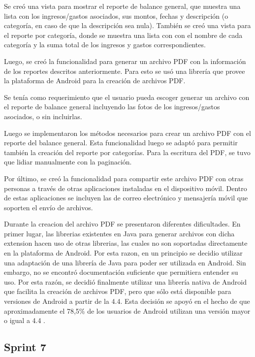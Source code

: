 Se creó una vista para mostrar el reporte de balance general, que muestra una lista con los ingresos/gastos asociados, sus montos, fechas y descripción (o categoría, en caso de que la descripción sea nula). También se creó una vista para el reporte por categoría, donde se muestra una lista con con el nombre de cada categoría y la suma total de los ingresos y gastos correspondientes.

Luego, se creó la funcionalidad para generar un archivo PDF con la información de los reportes descritos anteriormente. Para esto se usó una librería que provee la plataforma de Android para la creación de archivos PDF.  

Se tenía como requerimiento que el usuario pueda escoger generar un archivo con el reporte de balance general incluyendo las fotos de los ingresos/gastos asociados, o sin incluirlas.

Luego se implementaron los métodos necesarios para crear un archivo PDF con el reporte del balance general. Esta funcionalidad luego se adaptó para permitir también la creación del reporte por categorías. Para la escritura del PDF, se tuvo que lidiar manualmente con la paginación. 

Por último, se creó la funcionalidad para compartir este archivo PDF con otras personas a través de otras aplicaciones instaladas en el dispositivo móvil. Dentro de estas aplicaciones se incluyen las de correo electrónico y mensajería móvil que soporten el envío de archivos.

Durante la creacion del archivo PDF se presentaron diferentes dificultades. En primer lugar, las librerias existentes en Java para generar archivos con dicha extension hacen uso de otras librerias, las cuales no son soportadas directamente en la plataforma de Android. Por esta razon, en un principio se decidio utilizar una adaptación de una librería de Java para poder ser utilizada en Android. Sin embargo, no se encontró documentación suficiente que permitiera entender su uso. Por esta razón, se decidió finalmente utilizar una librería nativa de Android que facilita la creación de archivos PDF, pero que sólo está disponible para versiones de Android a partir de la 4.4. Esta decisión se apoyó en el hecho de que aproximadamente el 78,5\% de los usuarios de Android utilizan una versión mayor o igual a 4.4 \cite{USG1}. 


\subsection{Sprint 7}
